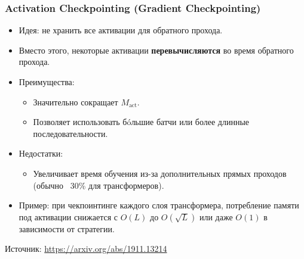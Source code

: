\begin{frame}
  \frametitle{Activation Checkpointing (Gradient Checkpointing)}
  \begin{itemize}
    \item Идея: не хранить все активации для обратного прохода.
    \item Вместо этого, некоторые активации \textbf{перевычисляются} во время обратного прохода.
    \item Преимущества:
      \begin{itemize}
        \item Значительно сокращает $M_{\text{act}}$.
        \item Позволяет использовать бóльшие батчи или более длинные последовательности.
      \end{itemize}
    \item Недостатки:
      \begin{itemize}
        \item Увеличивает время обучения из-за дополнительных прямых проходов (обычно ~30\% для трансформеров).
      \end{itemize}
    \item Пример: при чекпоинтинге каждого слоя трансформера, потребление памяти под активации снижается с $O(L)$ до $O(\sqrt{L})$ или даже $O(1)$ в зависимости от стратегии.
  \end{itemize}
  \vspace{0.5cm}
  \begin{flushright}
    \tiny Источник: \url{https://arxiv.org/abs/1911.13214}
  \end{flushright}
\end{frame}

